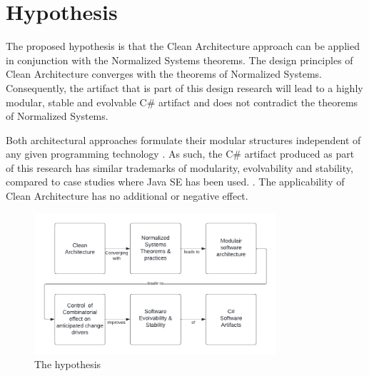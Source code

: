 \section{Hypothesis} \label{hypothesis} 

The proposed hypothesis is that the Clean Architecture approach can be applied in
conjunction with the Normalized Systems theorems. The design principles of Clean
Architecture converges with the theorems of Normalized Systems. Consequently, the artifact
that is part of this design research will lead to a highly modular, stable and evolvable
C\# artifact and does not contradict the theorems of Normalized Systems.

Both architectural approaches formulate their modular structures independent of any given
programming technology \parencite[]{mannaert_normalized_2009,robert_c_martin_clean_2018}. As such,
the C\# artifact produced as part of this research has similar trademarks of modularity,
evolvability and stability, compared to case studies where Java SE has been used.
\parencites[]{oorts_building_2014, de_bruyn_enabling_2018}. The applicability of Clean
Architecture has no additional or negative effect.

\begin{figure}[H]
    \centering
    \includegraphics[width=0.8\textwidth]{Figures/hypothesis.pdf}
    \caption[The hypothesis]{The hypothesis}
    \label{fig_hypothesis}
\end{figure}